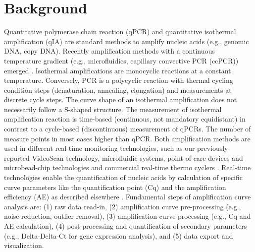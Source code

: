 \documentclass[twocolumn]{bmcart}%
\begin{document}

\section*{Background}

Quantitative polymerase chain reaction (qPCR) and quantitative isothermal 
amplification (qIA) are standard methods to amplify nucleic acids (e.g., genomic 
DNA, copy DNA). Recently amplification methods with a continuous temperature 
gradient (e.g., microfluidics, capillary convective PCR (ccPCR)) emerged 
\cite{bustin_miqe_2009, rodiger_nucleic_2014, chou_rapid_2011}. Isothermal 
amplifications 
are monocyclic reactions at a constant temperature. Conversely, PCR is a 
polycyclic reaction with thermal cycling condition steps (denaturation, 
annealing, elongation) and measurements at discrete cycle steps. The curve shape 
of an isothermal amplification does not necessarily follow a S-shaped structure. 
The measurement of isothermal amplification reaction is time-based (continuous, 
not mandatory equidistant) in contrast to a cycle-based (discontinuous) 
measurement of qPCRs. The number of measure points in most cases higher than 
qPCR. Both amplification methods are used in different real-time monitoring 
technologies, such as our previously reported VideoScan technology, microfluidic 
systems, point-of-care devices and microbead-chip technologies and commercial 
real-time thermo cyclers \cite{chang_2012, roediger_highly_2013, 
roediger_bead_qPCR_2013, rodiger_nucleic_2014}. Real-time technologies enable 
the quantification of nucleic acids by calculation of specific curve parameters 
like the quantification point (Cq) and the amplification efficiency (AE) as 
described elsewhere \cite{ruijter_2013,tellinghuisen_2014}. Fundamental steps of 
amplification curve analysis are: (1) raw data read-in, (2) amplification curve 
pre-processing (e.g., noise reduction, outlier removal), (3) amplification curve 
processing (e.g., Cq and AE calculation), (4) post-processing and quantification 
of secondary parameters (e.g., Delta-Delta-Ct for gene expression analysis), 
and (5) data export and visualization.
\end{document}
